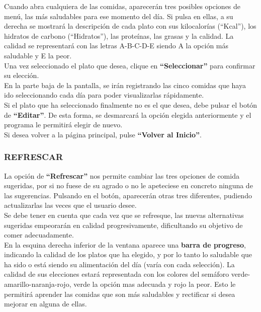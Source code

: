 Cuando abra cualquiera de las comidas, aparecerán tres posibles opciones de menú, las más saludables para ese momento del día. Si pulsa en ellas, a su derecha se mostrará la descripción de cada plato con sus kilocalorías (“Kcal”), los hidratos de carbono (“Hidratos”), las proteínas, las grasas y la calidad. La calidad se representará con las letras A-B-C-D-E siendo A la opción más saludable y E la peor.\\

Una vez seleccionado el plato que desea, clique en \textbf{“Seleccionar”} para confirmar su elección.\\

En la parte baja de la pantalla, se irán registrando las cinco comidas que haya ido seleccionando cada día para poder visualizarlas rápidamente.\\
Si el plato que ha seleccionado finalmente no es el que desea, debe pulsar el botón de \textbf{“Editar”}. De esta forma, se desmarcará la opción elegida anteriormente y el programa le permitirá elegir de nuevo.\\
Si desea volver a la página principal, pulse \textbf{“Volver al Inicio”}.
\subsubsection{REFRESCAR}
La opción de \textbf{“Refrescar”} nos permite cambiar las tres opciones de comida sugeridas, por si no fuese de su agrado o no le apeteciese en concreto ninguna de las sugerencias. Pulsando en el botón, aparecerán otras tres diferentes, pudiendo actualizarlas las veces que el usuario desee.\\

Se debe tener en cuenta que cada vez que se refresque, las nuevas alternativas sugeridas empeorarán en calidad progresivamente, dificultando su objetivo de comer adecuadamente.\\

En la esquina derecha inferior de la ventana aparece una \textbf{barra de progreso}, indicando la calidad de los platos que ha elegido, y por lo tanto lo saludable que ha sido o está siendo su alimentación del día (varía con cada selección). La calidad de sus elecciones estará representada con los colores del semáforo verde-amarillo-naranja-rojo, verde la opción mas adecuada y rojo la peor. Esto le permitirá aprender las comidas que son más saludables y rectificar si desea mejorar en alguna de ellas.\\
